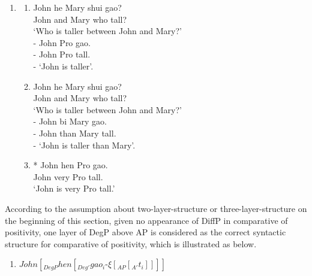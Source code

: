 \documentclass{ctexart}
\begin{document}
\begin{enumerate}
    \item \label{positivity_example_2}
    \begin{enumerate}
        \item \label{positivity_example_2_a}
        John \enspace he Mary shui gao? \\
        John and Mary who tall? \\
        `Who is taller between John and Mary?' \\
        - John Pro gao.\\
        - John Pro tall. \\
        - `John is taller'.

        \item \label{positivity_example_2_b}
        John \enspace he Mary shui gao? \\
        John and Mary who tall? \\
        `Who is taller between John and Mary?' \\
        - John bi Mary gao.\\
        - John than Mary tall. \\
        - `John is taller than Mary'.

        \item \label{positivity_example_3_a}
        * John hen Pro gao.  \\
        \hspace*{0.5em} John very Pro tall. \\
        \hspace*{0.5em} `John is very Pro tall.'

    \end{enumerate}
\end{enumerate}

According to the assumption about two-layer-structure or three-layer-structure on the beginning of this section, given no appearance of DiffP in comparative of positivity, one layer of DegP above AP is considered as the correct syntactic structure for comparative of positivity, which is illustrated as below.

\begin{enumerate}
    \item $John [_{DegP} hen [_{Deg'} gao_i \mbox{-} \xi [_{AP} [_{A'}t_i]]]]$
\end{enumerate}
\end{document}
